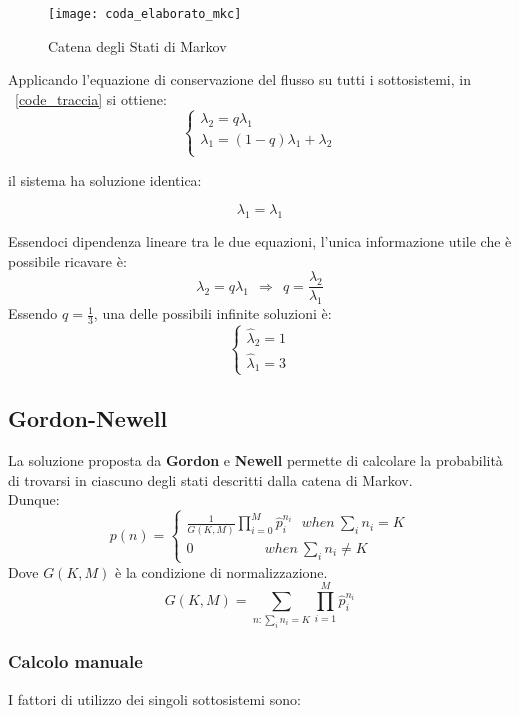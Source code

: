 \begin{figure}[!htbp]
  \centering
  \texttt{[image: coda\_elaborato\_mkc]}
  \caption{Catena degli Stati di Markov}
  \label{}
\end{figure}

Applicando l'equazione di conservazione del flusso su tutti i sottosistemi, in
\figurename~\ref{code_traccia} si ottiene:
$$
\begin{cases}\lambda_2 = q\lambda_1 \\
\lambda_1 = (1-q)\lambda_1 + \lambda_2 \\
\end{cases}
$$


il sistema ha soluzione identica:

$$ \lambda_1 = \lambda_1 $$

Essendoci dipendenza lineare tra le due equazioni, l'unica informazione utile che
è possibile ricavare è:
$$ \lambda_2 = q \lambda_1 \ \ \Longrightarrow \ \ q=\frac{\lambda_2}{\lambda_1}$$
Essendo $q = \frac{1}{3} $, una delle possibili infinite soluzioni è:
$$
\begin{cases}
\widehat{\lambda}_2 = 1 \\
\widehat{\lambda}_1 = 3
\end{cases}
$$

\clearpage

\subsection{Gordon-Newell}
La soluzione proposta da \textbf{Gordon} e \textbf{Newell} permette di calcolare
la probabilità di trovarsi in ciascuno degli stati descritti dalla catena di Markov.\\
Dunque:
$$ p(n)=
\begin{cases}
  \frac{1}{G(K,M)}\prod_{i=0}^M \widehat{p}_i^{n_i} \ \ \ when \ \sum_{i}n_i = K\\
  0 \ \ \ \ \ \ \ \ \ \ \ \ \ \ \ \ \ \ \ \ \ \ \ when \ \sum_{i}n_i \neq K
\end{cases}
$$
Dove $G(K,M)$ è la condizione di normalizzazione.
$$ G(K,M)=\sum_{n : \sum_{i}n_i=K} \prod_{i=1}^M \widehat{p}_i^{n_i}$$


\subsubsection{Calcolo manuale}

I fattori di utilizzo dei singoli sottosistemi sono:

